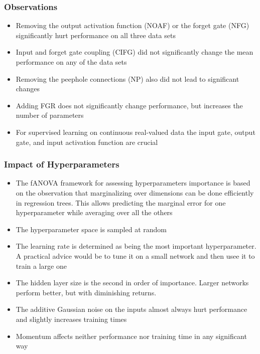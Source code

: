 \documentclass{beamer}
\begin{document}
\begin{frame}
\frametitle{Observations}
\begin{itemize}
	\item Removing the output activation function (NOAF) or the forget gate (NFG) significantly hurt performance on all three data sets
	\item Input and forget gate coupling (CIFG) did not significantly change the mean performance on any of the data sets
	\item Removing the peephole connections (NP) also did not lead to significant changes
	\item Adding FGR does not significantly change performance, but increases the number of parameters
	\item For supervised learning on continuous real-valued data the input gate, output gate, and input activation function are crucial
\end{itemize}
\end{frame}

\begin{frame}
\frametitle{Impact of Hyperparameters}
\begin{itemize}
	\item The fANOVA framework for assessing hyperparameters importance is based on the observation that marginalizing over dimensions can be done efficiently in regression trees. This allows predicting the marginal error for one hyperparameter while averaging over all the others
	\item The hyperparameter space is sampled at random
	\item The learning rate is determined as being the most important hyperparameter. A practical advice would be to tune it on a small network and then usee it to train a large one
	\item The hidden layer size is the second in order of importance. Larger networks perform better, but with diminishing returns.
	\item The additive Gaussian noise on the inputs almost always hurt performance and slightly increases training times
	\item Momentum affects neither performance nor training time in any significant way
\end{itemize}
\end{frame}
\end{document}
